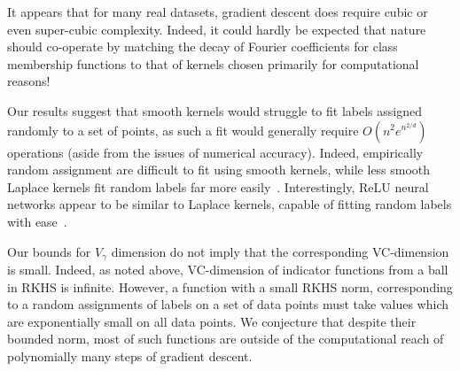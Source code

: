 \documentclass[final,12pt]{colt2018}
\begin{document}
 It appears that for many real datasets, gradient descent does require cubic or even super-cubic complexity. Indeed, it could  hardly be expected that nature should co-operate by matching the decay of Fourier coefficients for class membership functions to that  of kernels chosen primarily for computational reasons! 

\begin{remark} 
Our results suggest that smooth kernels would struggle to fit labels assigned randomly to a set of points, as such a fit  would generally require  $O(n^2 e^{n^{2/d}})$ operations (aside from the issues of numerical accuracy).  Indeed,  empirically random assignment  are difficult to fit using smooth kernels, while less smooth  Laplace kernels fit random labels far more easily~\cite{belkin2018understand}. Interestingly, ReLU neural networks appear to be similar to Laplace kernels, capable of fitting random labels with ease~\cite{zhang16understanding}.  
\end{remark}
\begin{remark}
Our bounds  for $V_\gamma$ dimension do not imply that the corresponding VC-dimension is small. Indeed, as noted above, VC-dimension of indicator functions from a ball in RKHS is infinite.  However, a function with a small RKHS norm,
corresponding to a random assignments of labels on a set of data points
must take values which are  exponentially small on all data points.  We conjecture that despite their bounded norm, most of such functions are outside of the computational reach of polynomially many steps of gradient descent. 
\end{remark}
\end{document}
